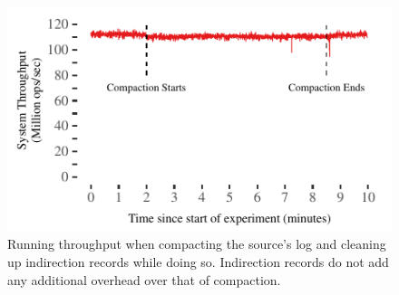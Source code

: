 \begin{figure}[t]
\centering
\includegraphics[width=\columnwidth]{graphs/compaction.pdf}
\caption{Running throughput when compacting the source's log and
    cleaning up indirection records while doing so. Indirection records
    do not add any additional overhead over that of compaction.}
\label{fig:compaction}
\end{figure}
